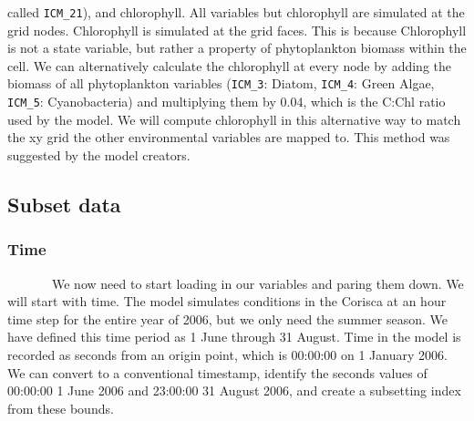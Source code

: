 \documentclass[
]{article}
\begin{document}
called \texttt{ICM\_21}), and chlorophyll. All variables but chlorophyll
are simulated at the grid nodes. Chlorophyll is simulated at the grid
faces. This is because Chlorophyll is not a state variable, but rather a
property of phytoplankton biomass within the cell. We can alternatively
calculate the chlorophyll at every node by adding the biomass of all
phytoplankton variables (\texttt{ICM\_3}: Diatom, \texttt{ICM\_4}: Green
Algae, \texttt{ICM\_5}: Cyanobacteria) and multiplying them by 0.04,
which is the C:Chl ratio used by the model. We will compute chlorophyll
in this alternative way to match the xy grid the other environmental
variables are mapped to. This method was suggested by the model
creators.

\newpage

\hypertarget{subset-data}{%
\subsection{Subset data}\label{subset-data}}

\hypertarget{time}{%
\subsubsection{Time}\label{time}}

~~~~~~~We now need to start loading in our variables and paring them
down. We will start with time. The model simulates conditions in the
Corisca at an hour time step for the entire year of 2006, but we only
need the summer season. We have defined this time period as 1 June
through 31 August. Time in the model is recorded as seconds from an
origin point, which is 00:00:00 on 1 January 2006. We can convert to a
conventional timestamp, identify the seconds values of 00:00:00 1 June
2006 and 23:00:00 31 August 2006, and create a subsetting index from
these bounds.

\singlespacing
\end{document}
